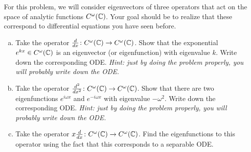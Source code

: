 \documentclass[12pt]{article} %
\begin{document}
\begin{problem} For this problem, we will consider eigenvectors of three operators that act on the space of analytic functions $C^\omega(\mathbb{C})$. Your goal should be to realize that these correspond to differential equations you have seen before.
\begin{enumerate}[(a)]
    \item Take the operator $\frac{d}{dx}\colon C^\omega(\mathbb{C})\to C^\omega(\mathbb{C})$. Show that the exponential $e^{kx}\in C^\omega(\mathbb{C})$ is an eigenvector (or eigenfunction) with eigenvalue $k$. Write down the corresponding ODE. \emph{Hint: just by doing the problem properly, you will probably write down the ODE.}
    \item Take the operator $\frac{d^2}{dx^2}\colon C^\omega(\mathbb{C})\to C^\omega(\mathbb{C})$. Show that there are two eigenfunctions $e^{i\omega x}$ and $e^{-i\omega x}$ with eigenvalue $-\omega^2$. Write down the corresponding ODE. \emph{Hint: just by doing the problem properly, you will probably write down the ODE.}
    \item Take the operator $x\frac{d}{dx} \colon C^\omega(\mathbb{C}) \to C^\omega(\mathbb{C})$. Find the eigenfunctions to this operator using the fact that this corresponds to a separable ODE.
\end{enumerate}
\end{problem}~
\end{document}
